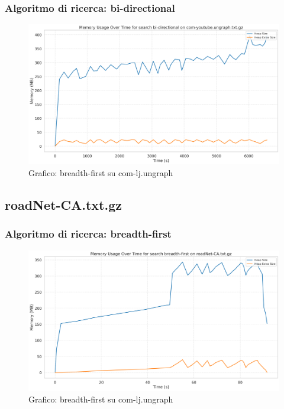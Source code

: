 \documentclass{article}
\begin{document}
\subsubsection{Algoritmo di ricerca: bi-directional}
\begin{figure}[htbp]\centering
\includegraphics[width=\textwidth]{../plots/com-youtube.ungraph_bi-directional.png}
\caption{Grafico: breadth-first su com-lj.ungraph}
\end{figure}
\subsection{roadNet-CA.txt.gz}
\subsubsection{Algoritmo di ricerca: breadth-first}
\begin{figure}[htbp]\centering
\includegraphics[width=\textwidth]{../plots/roadNet-CA_breadth-first.png}
\caption{Grafico: breadth-first su com-lj.ungraph}
\end{figure}
\end{document}
